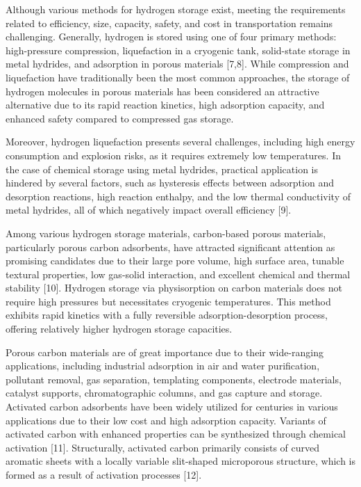 Although various methods for hydrogen storage exist, meeting the
requirements related to efficiency, size, capacity, safety, and cost in
transportation remains challenging. Generally, hydrogen is stored using
one of four primary methods: high-pressure compression, liquefaction in
a cryogenic tank, solid-state storage in metal hydrides, and adsorption
in porous materials {[}7,8{]}. While compression and liquefaction have
traditionally been the most common approaches, the storage of hydrogen
molecules in porous materials has been considered an attractive
alternative due to its rapid reaction kinetics, high adsorption
capacity, and enhanced safety compared to compressed gas storage.

Moreover, hydrogen liquefaction presents several challenges, including
high energy consumption and explosion risks, as it requires extremely
low temperatures. In the case of chemical storage using metal hydrides,
practical application is hindered by several factors, such as hysteresis
effects between adsorption and desorption reactions, high reaction
enthalpy, and the low thermal conductivity of metal hydrides, all of
which negatively impact overall efficiency {[}9{]}.

Among various hydrogen storage materials, carbon-based porous materials,
particularly porous carbon adsorbents, have attracted significant
attention as promising candidates due to their large pore volume, high
surface area, tunable textural properties, low gas-solid interaction,
and excellent chemical and thermal stability {[}10{]}. Hydrogen storage
via physisorption on carbon materials does not require high pressures
but necessitates cryogenic temperatures. This method exhibits rapid
kinetics with a fully reversible adsorption-desorption process, offering
relatively higher hydrogen storage capacities.

Porous carbon materials are of great importance due to their
wide-ranging applications, including industrial adsorption in air and
water purification, pollutant removal, gas separation, templating
components, electrode materials, catalyst supports, chromatographic
columns, and gas capture and storage. Activated carbon adsorbents have
been widely utilized for centuries in various applications due to their
low cost and high adsorption capacity. Variants of activated carbon with
enhanced properties can be synthesized through chemical activation
{[}11{]}. Structurally, activated carbon primarily consists of curved
aromatic sheets with a locally variable slit-shaped microporous
structure, which is formed as a result of activation processes {[}12{]}.

